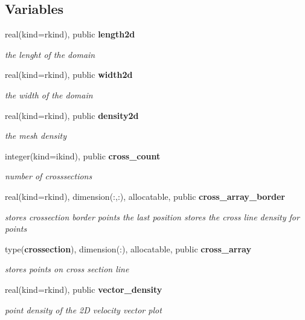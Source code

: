 \subsection*{Variables}
\begin{DoxyCompactItemize}
\item 
real(kind=rkind), public {\bf length2d}
\begin{DoxyCompactList}\small\item\em the lenght of the domain \end{DoxyCompactList}\item 
real(kind=rkind), public {\bf width2d}
\begin{DoxyCompactList}\small\item\em the width of the domain \end{DoxyCompactList}\item 
real(kind=rkind), public {\bf density2d}
\begin{DoxyCompactList}\small\item\em the mesh density \end{DoxyCompactList}\item 
integer(kind=ikind), public {\bf cross\+\_\+count}
\begin{DoxyCompactList}\small\item\em number of crosssections \end{DoxyCompactList}\item 
real(kind=rkind), dimension(\+:,\+:), allocatable, public {\bf cross\+\_\+array\+\_\+border}
\begin{DoxyCompactList}\small\item\em stores crossection border points the last position stores the cross line density for points \end{DoxyCompactList}\item 
type({\bf crossection}), dimension(\+:), allocatable, public {\bf cross\+\_\+array}
\begin{DoxyCompactList}\small\item\em stores points on cross section line \end{DoxyCompactList}\item 
real(kind=rkind), public {\bf vector\+\_\+density}
\begin{DoxyCompactList}\small\item\em point density of the 2D velocity vector plot \end{DoxyCompactList}\end{DoxyCompactItemize}


